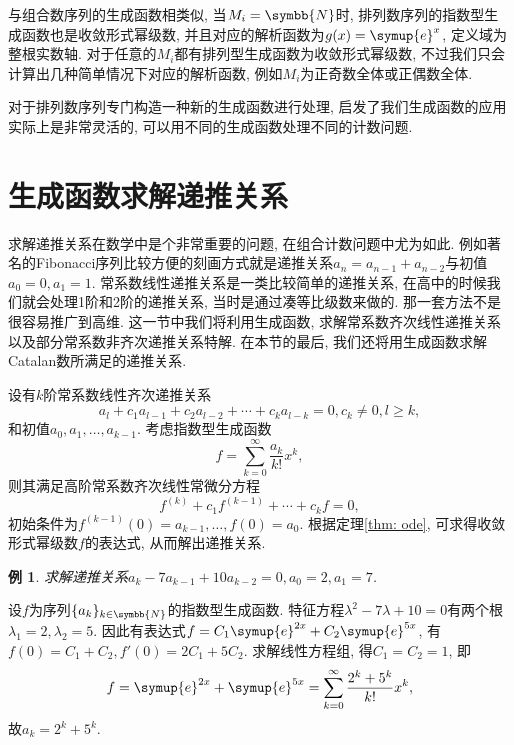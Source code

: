 \documentclass[chinese]{assignment}[2019/10/15]
\newcommand{\me}{\symup{e}}
\newcommand{\BN}{\symbb{N}}
\theoremstyle{plain}
\newtheorem{example}[theorem]{例}
\begin{document}
    与组合数序列的生成函数相类似, 当$M_i=\BN$时, 排列数序列的指数型生成函数也是收敛形式幂级数, 并且对应的解析函数为$g(x)=\me^x$, 定义域为整根实数轴. 对于任意的$M_i$都有排列型生成函数为收敛形式幂级数, 不过我们只会计算出几种简单情况下对应的解析函数, 例如$M_i$为正奇数全体或正偶数全体.

    对于排列数序列专门构造一种新的生成函数进行处理, 启发了我们生成函数的应用实际上是非常灵活的, 可以用不同的生成函数处理不同的计数问题.

    \section{生成函数求解递推关系}

    求解递推关系在数学中是个非常重要的问题, 在组合计数问题中尤为如此. 例如著名的Fibonacci序列比较方便的刻画方式就是递推关系$a_n=a_{n-1}+a_{n-2}$与初值$a_0=0, a_1=1$. 常系数线性递推关系是一类比较简单的递推关系, 在高中的时候我们就会处理1阶和2阶的递推关系, 当时是通过凑等比级数来做的. 那一套方法不是很容易推广到高维. 这一节中我们将利用生成函数, 求解常系数齐次线性递推关系以及部分常系数非齐次递推关系特解. 在本节的最后, 我们还将用生成函数求解Catalan数所满足的递推关系.

    设有$k$阶常系数线性齐次递推关系
    \begin{equation}
        a_{l} + c_1a_{l-1}+c_2a_{l-2}+ \dotsb + c_ka_{l-k} = 0, c_k\neq 0, l\geq k,
    \end{equation}
    和初值$a_0, a_1, \dotsc, a_{k-1}$.
    考虑指数型生成函数
    \begin{equation}
        f = \sum_{k=0}^\infty \frac{a_k}{k!}x^k,
    \end{equation}
    则其满足高阶常系数齐次线性常微分方程
    \begin{equation}
        f^{(k)}+c_1f^{(k-1)}+\dotsb+c_kf = 0,
    \end{equation}
    初始条件为$f^{(k-1)}(0) = a_{k-1}, \dotsc, f(0) = a_0$. 根据定理\ref{thm: ode}, 可求得收敛形式幂级数$f$的表达式, 从而解出递推关系.

    \begin{example}
        求解递推关系$a_k-7a_{k-1}+10a_{k-2}=0, a_0=2, a_1=7$.
    \end{example}

    \begin{solution}
        设$f$为序列$\{a_k\}_{k\in\BN}$的指数型生成函数. 特征方程$\lambda^2-7\lambda+10=0$有两个根$\lambda_1=2, \lambda_2=5$. 因此有表达式$f=C_1\me^{2x}+C_2\me^{5x}$, 有$f(0)=C_1+C_2, f'(0)=2C_1+5C_2$. 求解线性方程组, 得$C_1=C_2 = 1$, 即
        \begin{equation}
            f=\me^{2x}+\me^{5x} = \sum_{k=0}^\infty \frac{2^k+5^k}{k!}x^k,
        \end{equation}
        故$a_k=2^k+5^k$.
    \end{solution}
\end{document}
